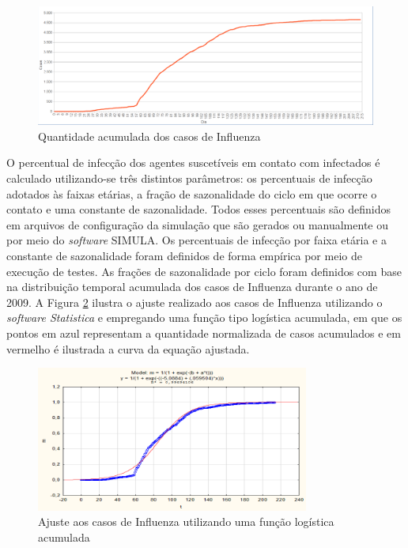 \begin{figure}[H]
  \centering
  \includegraphics[width=1\textwidth]{Figuras/Observacoes/CasosAcumulados.png}
  \caption{Quantidade acumulada dos casos de Influenza}
  \label{fig:casos_acumulados}
\end{figure} 

O percentual de infecção dos agentes suscetíveis em contato com infectados é calculado utilizando-se três distintos parâmetros: os percentuais de infecção adotados às faixas etárias, a fração de sazonalidade do ciclo em que ocorre o contato e uma constante de sazonalidade. Todos esses percentuais são definidos em arquivos de configuração da simulação que são gerados ou manualmente ou por meio do \textit{software} SIMULA. Os percentuais de infecção por faixa etária e a constante de sazonalidade foram definidos de forma empírica por meio de execução de testes. As frações de sazonalidade por ciclo foram definidos com base na distribuição temporal acumulada dos casos de Influenza durante o ano de 2009. A Figura \ref{fig:curva_teorica} ilustra o ajuste realizado aos casos de Influenza utilizando o \textit{software Statistica} e empregando uma função tipo logística acumulada, em que os pontos em azul representam a quantidade normalizada de casos acumulados e em vermelho é ilustrada a curva da equação ajustada. 

\begin{figure}[H]
  \centering
  \includegraphics[width=0.8\textwidth]{Figuras/Observacoes/Teorico.png}
  \caption{Ajuste aos casos de Influenza utilizando uma função logística acumulada}
  \label{fig:curva_teorica}
\end{figure} 

